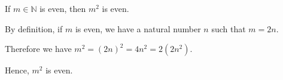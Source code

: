 If $m \in \mathbb{N}$ is even, then $m^2$ is even.

By definition, if $m$ is even, we have a natural number $n$ such that $m = 2n$.

Therefore we have $m^2 = (2n)^2 = 4n^2 = 2(2n^2)$.

Hence, $m^2$ is even.